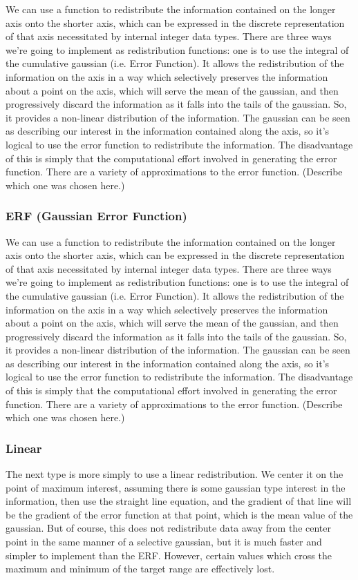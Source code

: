 \documentclass[10pt,a4paper]{article}
\begin{document}
We can use a function to redistribute the information contained on the longer axis onto the shorter axis, which can be expressed in the discrete representation of that axis necessitated by internal integer data types. There are three ways we're going to implement as redistribution functions: one is to use the integral of the cumulative gaussian (i.e. Error Function). It allows the redistribution of the information on the axis in a way which selectively preserves the information about a point on the axis, which will serve the mean of the gaussian, and then progressively discard the information as it falls into the tails of the gaussian. So, it provides a non-linear distribution of the information. The gaussian can be seen as describing our interest in the information contained along the axis, so it's logical to use the error function to redistribute the information. The disadvantage of this is simply that the computational effort involved in generating the error function. There are a variety of approximations to the error function. (Describe which one was chosen here.)

\subsubsection{ERF (Gaussian Error Function)}\label{sec:ERF}
We can use a function to redistribute the information contained on the longer axis onto the shorter axis, which can be expressed in the discrete representation of that axis necessitated by internal integer data types. There are three ways we're going to implement as redistribution functions: one is to use the integral of the cumulative gaussian (i.e. Error Function). It allows the redistribution of the information on the axis in a way which selectively preserves the information about a point on the axis, which will serve the mean of the gaussian, and then progressively discard the information as it falls into the tails of the gaussian. So, it provides a non-linear distribution of the information. The gaussian can be seen as describing our interest in the information contained along the axis, so it's logical to use the error function to redistribute the information. The disadvantage of this is simply that the computational effort involved in generating the error function. There are a variety of approximations to the error function. (Describe which one was chosen here.)

\subsubsection{Linear}\label{sec:Linear}
The next type is more simply to use a linear redistribution. We center it on the point of maximum interest, assuming there is some gaussian type interest in the information, then use the straight line equation, and the gradient of that line will be the gradient of the error function at that point, which is the mean value of the gaussian. But of course, this does not redistribute data away from the center point in the same manner of a selective gaussian, but it is much faster and simpler to implement than the ERF. However, certain values which cross the maximum and minimum of the target range are effectively lost.
\end{document}

